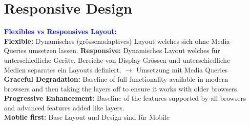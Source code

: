 
\section{Responsive Design}
\textbf{\textcolor{blue}{Flexibles vs Responsives Layout:}}\\
\textbf{Flexible:} Dynamisches (grössenadaptives) Layout welches sich ohne Media-Queries umsetzen lassen. \textbf{Responsive:} Dynamisches Layout welches für unterschiedliche Geräte, Bereiche von Display-Grössen und unterschiedliche Medien separates ein Layouts definiert. $\rightarrow$ Umsetzung mit Media Queries\\
\textbf{Graceful Degradation:}  Baseline of full functionality available in modern browsers and then taking the layers off to ensure it works with older browsers.\\
\textbf{Progressive Enhancement:} Baseline of the features supported by all browsers and advanced features added like layers.\\
\textbf{Mobile first:} Base Layout und Design sind für Mobile

